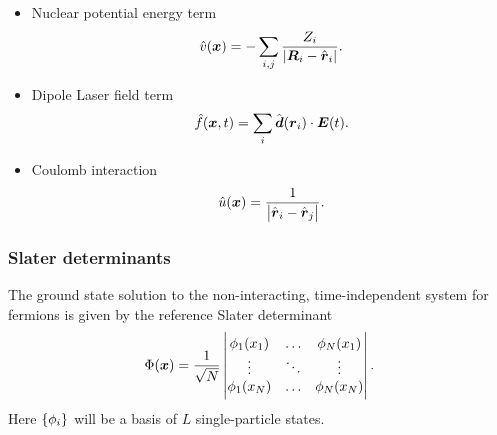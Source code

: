 \documentclass{beamer}
\begin{document}
\begin{frame}
    \begin{itemize}
        \item Nuclear potential energy term
            \begin{align}
                \hat{v}(\boldsymbol{x})
                = - \sum_{i, j}\frac{Z_i}{\abs{\boldsymbol{R}_i - \hat{\boldsymbol{r}}_i}}.
            \end{align}
        \item Dipole Laser field term
            \begin{align}
                \hat{f}(\boldsymbol{x}, t)
                = \sum_{i} \hat{\boldsymbol{d}}(\boldsymbol{r}_i)\cdot\boldsymbol{E}(t).
            \end{align}
        \item Coulomb interaction
            \begin{align}
                \hat{u}(\boldsymbol{x})
                = \frac{1}{\abs{\hat{\boldsymbol{r}}_i - \hat{\boldsymbol{r}}_j}}.
            \end{align}
    \end{itemize}
\end{frame}

\begin{frame}
    \frametitle{Slater determinants}
    The ground state solution to the non-interacting, time-independent system
    for fermions is given by the reference Slater determinant
    \begin{align}
        \Phi(\boldsymbol{x})
        = \frac{1}{\sqrt{N}}
        \begin{vmatrix}
            \phi_1(x_1) & \dots & \phi_N(x_1) \\
            \vdots & \ddots & \vdots \\
            \phi_1(x_N) & \dots & \phi_N(x_N)
        \end{vmatrix}.
    \end{align}
    Here $\left\{ \phi_i \right\}$ will be a basis of $L$ single-particle states.
\end{frame}
\end{document}
